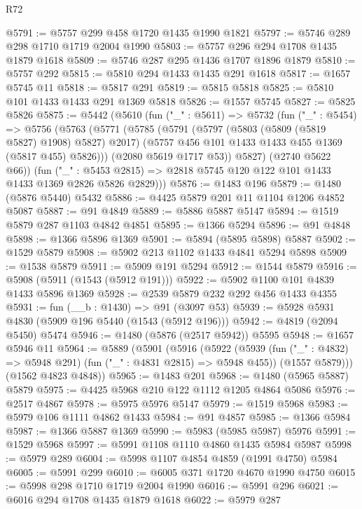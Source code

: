 \begin{lexlean}{R72}
\begin{coremodule}
@5791 := @5757 @299 @458 @1720 @1435 @1990 @1821
@5797 := @5746 @289 @298 @1710 @1719 @2004 @1990
@5803 := @5757 @296 @294 @1708 @1435 @1879 @1618
@5809 := @5746 @287 @295 @1436 @1707 @1896 @1879
@5810 := @5757 @292
@5815 := @5810 @294 @1433 @1435 @291 @1618
@5817 := @1657 @5745 @11
@5818 := @5817 @291
@5819 := @5815 @5818
@5825 := @5810 @101 @1433 @1433 @291 @1369 @5818
@5826 := @1557 @5745
@5827 := @5825 @5826
@5875 := @5442
    (@5610
      (fun ("_" : @5611) =>
      @5732
        (fun ("_" : @5454) =>
        @5756
          (@5763
            (@5771
              (@5785
                (@5791
                  (@5797 (@5803 (@5809 (@5819 @5827) @1908) @5827) @2017)
                  (@5757 @456 @101 @1433 @1433 @455 @1369 (@5817 @455) @5826)))
              (@2080 @5619 @1717 @53))
            @5827)
          (@2740 @5622 @66))
        (fun ("_" : @5453 @2815) =>
        @2818 @5745 @120 @122 @101 @1433 @1433 @1369 @2826 @5826 @2829)))
@5876 := @1483 @196
@5879 := @1480 (@5876 @5440) @5432
@5886 := @4425 @5879 @201 @11 @1104 @1206 @4852 @5087
@5887 := @91 @4849
@5889 := @5886 @5887 @5147
@5894 := @1519 @5879 @287 @1103 @4842 @4851
@5895 := @1366 @5294
@5896 := @91 @4848
@5898 := @1366 @5896 @1369
@5901 := @5894 (@5895 @5898) @5887
@5902 := @1529 @5879
@5908 := @5902 @213 @1102 @1433 @4841 @5294 @5898
@5909 := @1538 @5879
@5911 := @5909 @191 @5294
@5912 := @1544 @5879
@5916 := @5908 (@5911 (@1543 (@5912 @191)))
@5922 := @5902 @1100 @101 @4839 @1433 @5896 @1369
@5928 := @2539 @5879 @232 @292 @456 @1433 @4355
@5931 := fun (__b : @1430) => @91 (@3097 @53)
@5939 := @5928 @5931 @4830 (@5909 @196 @5440 (@1543 (@5912 @196)))
@5942 := @4819 (@2094 @5450) @5474
@5946 := @1480 (@5876 (@2517 @5942)) @5595
@5948 := @1657 @5946 @11
@5964 := @5889
    (@5901
      (@5916
        (@5922
          (@5939 (fun ("_" : @4832) => @5948 @291) (fun ("_" : @4831 @2815) => @5948 @455))
          (@1557 @5879)))
      (@1562 @4823 @4848))
@5965 := @1483 @201
@5968 := @1480 (@5965 @5887) @5879
@5975 := @4425 @5968 @210 @122 @1112 @1205 @4864 @5086
@5976 := @2517 @4867
@5978 := @5975 @5976 @5147
@5979 := @1519 @5968
@5983 := @5979 @106 @1111 @4862 @1433
@5984 := @91 @4857
@5985 := @1366 @5984
@5987 := @1366 @5887 @1369
@5990 := @5983 (@5985 @5987) @5976
@5991 := @1529 @5968
@5997 := @5991 @1108 @1110 @4860 @1435 @5984 @5987
@5998 := @5979 @289
@6004 := @5998 @1107 @4854 @4859 (@1991 @4750) @5984
@6005 := @5991 @299
@6010 := @6005 @371 @1720 @4670 @1990 @4750
@6015 := @5998 @298 @1710 @1719 @2004 @1990
@6016 := @5991 @296
@6021 := @6016 @294 @1708 @1435 @1879 @1618
@6022 := @5979 @287

\end{coremodule}
\end{lexlean}
